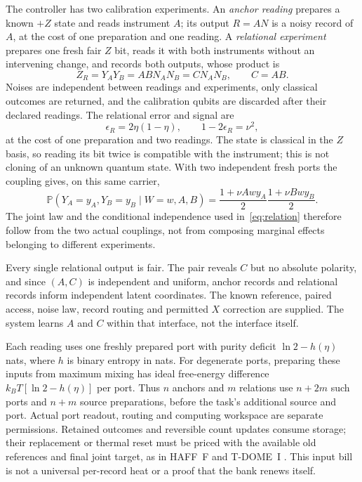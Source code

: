 \documentclass[11pt,a4paper]{article}
\newcommand{\Pp}{\mathbb P}
\begin{document}
The controller has two calibration experiments. An \emph{anchor reading} prepares a known $+Z$ state and reads instrument $A$; its output $R=AN$ is a noisy record of $A$, at the cost of one preparation and one reading. A \emph{relational experiment} prepares one fresh fair $Z$ bit, reads it with both instruments without an intervening change, and records both outputs, whose product is
\begin{equation}\label{eq:relation}
 Z_R=Y_AY_B=ABN_AN_B=CN_AN_B,\qquad C=AB.
\end{equation}
Noises are independent between readings and experiments, only classical outcomes are returned, and the calibration qubits are discarded after their declared readings. The relational error and signal are
\begin{equation}\label{eq:eps}
 \epsilon_R=2\eta(1-\eta),\qquad 1-2\epsilon_R=\nu^2,
\end{equation}
at the cost of one preparation and two readings. The state is classical in the $Z$ basis, so reading its bit twice is compatible with the instrument; this is not cloning of an unknown quantum state. With two independent fresh ports the coupling gives, on this same carrier,
\[
 \Pp(Y_A=y_A,Y_B=y_B\mid W=w,A,B)
 =\frac{1+\nu Aw y_A}{2}\frac{1+\nu Bw y_B}{2}.
\]
The joint law and the conditional independence used in~\eqref{eq:relation} therefore follow from the two actual couplings, not from composing marginal effects belonging to different experiments.

Every single relational output is fair. The pair reveals $C$ but no absolute polarity, and since $(A,C)$ is independent and uniform, anchor records and relational records inform independent latent coordinates. The known reference, paired access, noise law, record routing and permitted $X$ correction are supplied. The system learns $A$ and $C$ within that interface, not the interface itself.

Each reading uses one freshly prepared port with purity deficit $\ln2-h(\eta)$ nats, where $h$ is binary entropy in nats. For degenerate ports, preparing these inputs from maximum mixing has ideal free-energy difference $k_BT[\ln2-h(\eta)]$ per port. Thus $n$ anchors and $m$ relations use $n+2m$ such ports and $n+m$ source preparations, before the task's additional source and port. Actual port readout, routing and computing workspace are separate permissions. Retained outcomes and reversible count updates consume storage; their replacement or thermal reset must be priced with the available old references and final joint target, as in HAFF~F and T-DOME~I \cite{HAFFE,HAFFF,TDOMEI}. This input bill is not a universal per-record heat or a proof that the bank renews itself.
\end{document}
